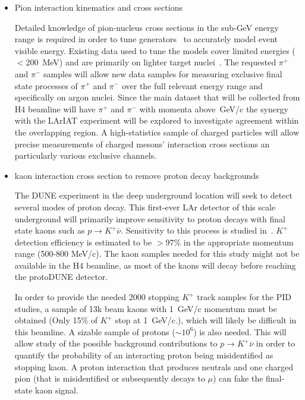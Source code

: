 \begin{itemize}
\item Pion interaction kinematics and cross sections

Detailed knowledge of pion-nucleus cross sections in the sub-GeV energy range is required in order
to tune generators~\cite{genie} to accurately model event visible energy. 
Existing data used to tune the models cover limited energies ($<$200~MeV) and are primarily on lighter target nuclei~\cite{fsirev}.
The requested $\pi^+$ and $\pi^-$ samples will allow new data samples for measuring
exclusive final state processes  of $\pi^+$ and $\pi^-$ over the full relevant energy range and specifically on argon nuclei. Since the main dataset that will be collected from H4 beamline will have $\pi^+$ and $\pi^-$ with momenta above\, GeV/c the synergy with the LArIAT experiment will be explored to investigate agreement within the overlapping region.  A high-statistics sample of charged particles will allow precise measurements of charged mesons' interaction cross sections an particularly various exclusive channels.
\item kaon interaction cross section to remove proton decay backgrounds


The DUNE experiment in the deep underground location will seek to detect several modes of proton decay.
This first-ever LAr detector of this scale underground will primarily improve sensitivity to 
proton decays with final state kaons such as  ${p \rightarrow K^+ \overline{\nu}}$. 
Sensitivity to this process is studied in~\cite{bueno}. $K^+$ detection efficiency is estimated to be $>$97\% in the
appropriate momentum range (500-800 MeV/c). The kaon samples needed for this study might not be available in the H4 beamline, as most of the kaons will decay before reaching the protoDUNE detector. 

In order to provide the needed 2000 stopping $K^+$ track samples for the PID studies, a sample of 13k beam kaons with 1~GeV/c momentum must be obtained (Only 15\% of $K^+$ stop at 1~GeV/c.), which will likely be difficult in this beamline. 
A sizable sample of protons ($\sim 10^6$) is also needed. This will allow study of the possible background contributions to $p \rightarrow K^+ \overline{\nu}$ in order to quantify the probability of an interacting proton 
being misidentified as stopping kaon. A proton interaction that produces neutrals and one charged pion 
(that is misidentified or subsequently decays to $\mu$) can fake the final-state kaon signal.


\end{itemize}
